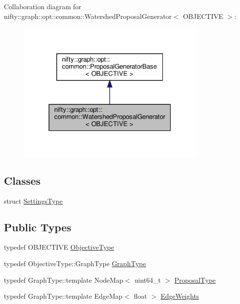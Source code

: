Collaboration diagram for nifty\+:\+:graph\+:\+:opt\+:\+:common\+:\+:Watershed\+Proposal\+Generator$<$ O\+B\+J\+E\+C\+T\+I\+VE $>$\+:
\nopagebreak
\begin{figure}[H]
\begin{center}
\leavevmode
\includegraphics[width=268pt]{classnifty_1_1graph_1_1opt_1_1common_1_1WatershedProposalGenerator__coll__graph}
\end{center}
\end{figure}
\subsection*{Classes}
\begin{DoxyCompactItemize}
\item 
struct \hyperlink{structnifty_1_1graph_1_1opt_1_1common_1_1WatershedProposalGenerator_1_1SettingsType}{Settings\+Type}
\end{DoxyCompactItemize}
\subsection*{Public Types}
\begin{DoxyCompactItemize}
\item 
typedef O\+B\+J\+E\+C\+T\+I\+VE \hyperlink{classnifty_1_1graph_1_1opt_1_1common_1_1WatershedProposalGenerator_a00f7d66acd5c7510f38ba3866f9644ff}{Objective\+Type}
\item 
typedef Objective\+Type\+::\+Graph\+Type \hyperlink{classnifty_1_1graph_1_1opt_1_1common_1_1WatershedProposalGenerator_a376349d1d4bc53280b7ad79f3193ed37}{Graph\+Type}
\item 
typedef Graph\+Type\+::template Node\+Map$<$ uint64\+\_\+t $>$ \hyperlink{classnifty_1_1graph_1_1opt_1_1common_1_1WatershedProposalGenerator_a94ccb07cc30e64f015714e21344c3cbe}{Proposal\+Type}
\item 
typedef Graph\+Type\+::template Edge\+Map$<$ float $>$ \hyperlink{classnifty_1_1graph_1_1opt_1_1common_1_1WatershedProposalGenerator_a0eab02b7bfa3b93e48b75e3335e18a5a}{Edge\+Weights}
\end{DoxyCompactItemize}
